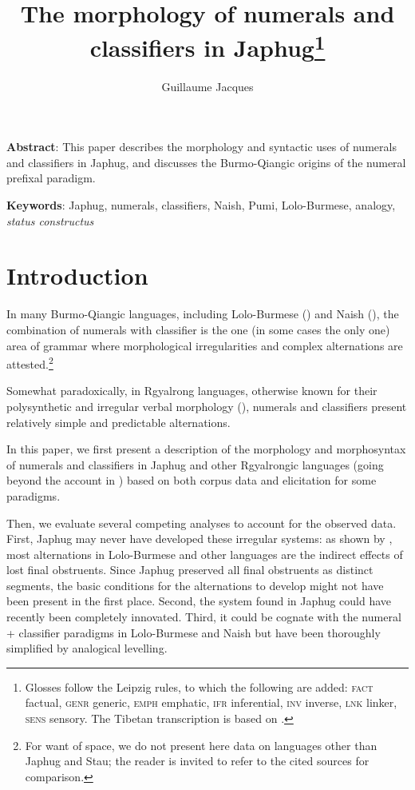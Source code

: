 \documentclass[oldfontcommands,oneside,a4paper,12pt]{article}
\begin{document}
\title{The morphology of numerals and classifiers  in Japhug\footnote{Glosses follow the Leipzig rules, to which the following are added:  \textsc{fact} factual, \textsc{genr} generic,   \textsc{emph} emphatic, \textsc{ifr} inferential, \textsc{inv} inverse, \textsc{lnk} linker, \textsc{sens} sensory. The Tibetan transcription is based on \citet{jacques12transcription}.} }
\author{Guillaume Jacques}
\maketitle

\sloppy

\textbf{Abstract}: This paper describes the morphology and syntactic uses of numerals and classifiers in Japhug, and discusses the Burmo-Qiangic origins of the numeral prefixal paradigm.

\textbf{Keywords}: Japhug, numerals, classifiers, Naish, Pumi, Lolo-Burmese, analogy, \textit{status constructus}

\section{Introduction}
In many Burmo-Qiangic languages, including Lolo-Burmese (\citealt{bradley05numerals}) and Naish (\citealt{michaud11cl, michaud13numeral}), the combination of numerals with classifier is the one (in some cases the only one) area of grammar where morphological irregularities and complex alternations are attested.\footnote{For want of space, we do not present here data on languages other than Japhug and Stau; the reader is invited to refer to the cited sources for comparison.}

Somewhat paradoxically, in Rgyalrong languages, otherwise known for their polysynthetic and irregular verbal morphology (\citealt{jackson14morpho, jacques12incorp}), numerals and classifiers present relatively simple and predictable alternations. 

In this paper, we first present a  description of the morphology and morphosyntax of numerals and classifiers in Japhug and other Rgyalrongic  languages (going beyond the account in   \citealt{jacques08}) based on both corpus data and elicitation for some paradigms. 

Then, we evaluate several competing analyses to account for the observed data. First,   Japhug may never have developed these irregular systems: as shown by \citet{bradley05numerals}, most alternations in Lolo-Burmese and other languages  are the indirect effects of lost final obstruents. Since Japhug preserved all final obstruents as distinct segments, the basic conditions for the alternations to develop might not have been present in the first place. Second, the system found in Japhug could have recently been completely innovated. Third,  it could be cognate with the numeral + classifier paradigms in Lolo-Burmese and Naish but have been thoroughly simplified by analogical levelling.   
\end{document}
